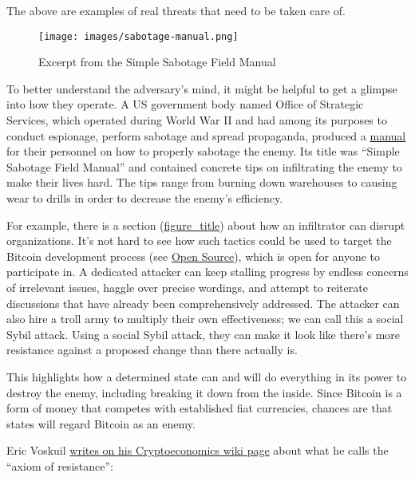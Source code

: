The above are examples of real threats that need to be taken care of.

\begin{figure}
\hypertarget{fig-sabotage-manual}{%
\centering
\texttt{[image: images/sabotage-manual.png]}
\caption{Excerpt from the Simple Sabotage Field
Manual}\label{fig-sabotage-manual}
}
\end{figure}

To better understand the adversary's mind, it might be helpful to get a
glimpse into how they operate. A US government body named Office of
Strategic Services, which operated during World War II and had among its
purposes to conduct espionage, perform sabotage and spread propaganda,
produced a \href{https://www.gutenberg.org/ebooks/26184}{manual} for
their personnel on how to properly sabotage the enemy. Its title was
``Simple Sabotage Field Manual'' and contained concrete tips on
infiltrating the enemy to make their lives hard. The tips range from
burning down warehouses to causing wear to drills in order to decrease
the enemy's efficiency.

For example, there is a section
(\protect\hyperlink{fig-sabotage-manual}{figure\_title}) about how an
infiltrator can disrupt organizations. It's not hard to see how such
tactics could be used to target the Bitcoin development process (see
\protect\hyperlink{opensource}{Open Source}), which is open for anyone
to participate in. A dedicated attacker can keep stalling progress by
endless concerns of irrelevant issues, haggle over precise wordings, and
attempt to reiterate discussions that have already been comprehensively
addressed. The attacker can also hire a troll army to multiply their own
effectiveness; we can call this a social Sybil attack. Using a social
Sybil attack, they can make it look like there's more resistance against
a proposed change than there actually is.

This highlights how a determined state can and will do everything in its
power to destroy the enemy, including breaking it down from the inside.
Since Bitcoin is a form of money that competes with established fiat
currencies, chances are that states will regard Bitcoin as an enemy.

Eric Voskuil
\href{https://github.com/libbitcoin/libbitcoin-system/wiki/Axiom-of-Resistance}{writes
on his Cryptoeconomics wiki page} about what he calls the ``axiom of
resistance'':


